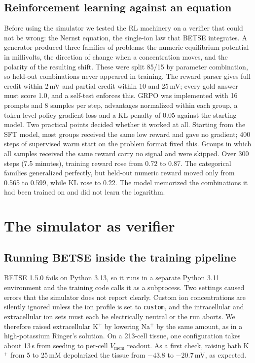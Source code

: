 \documentclass[11pt]{article}
\newcommand{\Vm}{V_\mathrm{mem}}
\begin{document}
\subsection{Reinforcement learning against an equation}
Before using the simulator we tested the RL machinery on a verifier that
could not be wrong: the Nernst equation, the single-ion law that BETSE
integrates. A generator produced three families of problems: the numeric
equilibrium potential in millivolts, the direction of change when a
concentration moves, and the polarity of the resulting shift. These were
split 85/15 by parameter combination, so held-out combinations never
appeared in training. The reward parser gives full credit within 2\,mV and
partial credit within 10 and 25\,mV; every gold answer must score 1.0, and a
self-test enforces this. GRPO \citep{shao2024deepseekmath} was implemented
with 16 prompts and 8 samples per step, advantages normalized within each
group, a token-level policy-gradient loss and a KL penalty of 0.05 against
the starting model. Two practical points decided whether it worked at all.
Starting from the SFT model, most groups received the same low reward
and gave no gradient; 400 steps of supervised warm start on the problem
format fixed this. Groups in which all samples received the same
reward carry no signal and were skipped. Over 300 steps (7.5 minutes),
training reward rose from 0.72 to 0.87. The categorical families
generalized perfectly, but held-out numeric reward moved only from 0.565 to
0.599, while KL rose to 0.22. The model memorized the combinations it had
been trained on and did not learn the logarithm.

\section{The simulator as verifier}
\label{sec:sim}

\subsection{Running BETSE inside the training pipeline}
BETSE 1.5.0 fails on Python 3.13, so it runs in a separate Python 3.11
environment and the training code calls it as a subprocess. Two settings
caused errors that the simulator does not report clearly. Custom ion
concentrations are silently ignored unless the ion profile is set to
\texttt{custom}, and the intracellular and extracellular ion sets must each
be electrically neutral or the run aborts. We therefore raised
extracellular K$^+$ by lowering Na$^+$ by the same amount, as in a
high-potassium Ringer's solution. On a 213-cell tissue, one configuration
takes about 13\,s from seeding to per-cell $\Vm$ readout. As a first check,
raising bath K$^+$ from 5 to 25\,mM depolarized the tissue from $-43.8$ to
$-20.7$\,mV, as expected.
\end{document}
